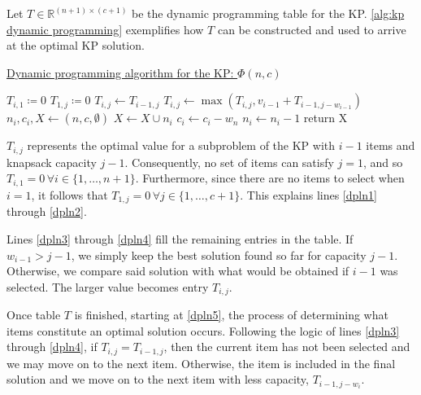 Let $T \in \mathbb{R}^{(n+1) \times (c+1)}$ be the dynamic programming table for the KP. \cref{alg:kp dynamic programming} exemplifies how $T$ can be constructed and used to arrive at the optimal KP solution.

\begin{algorithm}
    \caption{\href{https://github.com/phcentenaro7/IC-Knapsack/blob/main/Knapsack/USP/dynamic_knapsack.jl}{Dynamic programming algorithm for the KP: $\Phi(n, c)$}}
    \label{alg:kp dynamic programming}
    \begin{algorithmic}[1]
         \label{dpln1}
            \State $T_{i,1} \coloneqq 0$
        \EndFor
            \State $T_{1,j} \coloneqq 0$ \label{dpln2}
             \label{dpln3}
                \State $T_{i,j} \gets T_{i-1,j}$
                    \State $T_{i,j} \gets \max{(T_{i,j}, v_{i-1} + T_{i-1,j-w_{i-1}})}$\label{dpln4}
                \EndIf
            \EndFor
        \EndFor
        \State $n_i, c_i, X \gets (n, c, \emptyset)$
         \label{dpln5}
                \State $X \gets X \cup n_i$
                \State $c_i \gets c_i - w_n$
            \EndIf
            \State $n_i \gets n_i - 1$
        \EndWhile
        \State return X
    \end{algorithmic}
\end{algorithm}

$T_{i,j}$ represents the optimal value for a subproblem of the KP with $i - 1$ items and knapsack capacity $j - 1$. Consequently, no set of items can satisfy $j = 1$, and so $T_{i,1} = 0 \, \forall i \in \{1,\dots,n + 1\}$. Furthermore, since there are no items to select when $i = 1$, it follows that $T_{1,j} = 0 \, \forall j \in \{1,\dots,c + 1\}$. This explains lines \ref{dpln1} through \ref{dpln2}.

Lines \ref{dpln3} through \ref{dpln4} fill the remaining entries in the table. If $w_{i-1} > j - 1$, we simply keep the best solution found so far for capacity $j - 1$. Otherwise, we compare said solution with what would be obtained if $i - 1$ was selected. The larger value becomes entry $T_{i,j}$.

Once table $T$ is finished, starting at \cref{dpln5}, the process of determining what items constitute an optimal solution occurs. Following the logic of lines \ref{dpln3} through \ref{dpln4}, if $T_{i,j} = T_{i-1,j}$, then the current item has not been selected and we may move on to the next item. Otherwise, the item is included in the final solution and we move on to the next item with less capacity, $T_{i-1,j-w_i}$.

